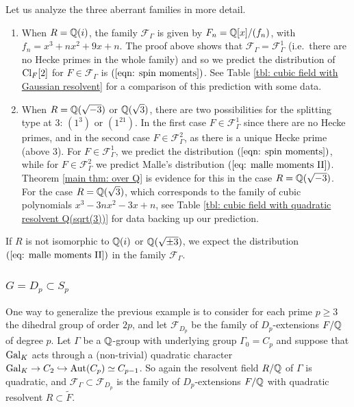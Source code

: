 \documentclass[11pt,a4paper]{amsart}
\def\Q{{\rm \mathbb{Q}}}
\def\Aut{{\rm Aut}}
\def\Cl{{\rm Cl}}
\def\Gal{{\rm Gal}}
\numberwithin{equation}{section}
\begin{document}
Let us analyze the three aberrant families in more detail. 
\begin{enumerate}
    \item 
When $R = \Q(i)$, the family $\mathcal{F}_\Gamma$ is given by $F_n = \Q[x]/(f_n)$, with $f_n = x^3 + nx^2 + 9x + n$. The proof above shows that $\mathcal{F}_\Gamma =\mathcal{F}_\Gamma^1$ (i.e.\ there are no Hecke primes in the whole family) and so we predict the distribution of $\Cl_F[2]$ for $F\in \mathcal{F}_\Gamma$ is $(\ref{eqn: spin moments})$.  See Table \ref{tbl: cubic field with Gaussian resolvent} for a comparison of this prediction with some data.
\item When $R = \Q(\sqrt{-3})$ or $\Q(\sqrt{3})$, there are two possibilities for the splitting type at $3$: $(1^3)$ or $(1^21)$. In the first case $F \in \mathcal{F}_\Gamma^1$ since there are no Hecke primes, and in the second case $F \in \mathcal{F}_\Gamma^2$, as there is a unique Hecke prime (above $3$). For $F \in \mathcal{F}_\Gamma^1$, we predict the distribution $(\ref{eqn: spin moments})$, while for $F \in \mathcal{F}_\Gamma^2$ we predict Malle's distribution $(\ref{eq: malle moments II})$. Theorem \ref{main thm: over Q} is evidence for this in the case $R = \Q(\sqrt{-3})$. For the case $R = \Q(\sqrt{3})$, which corresponds to the family of cubic polynomials $x^3 - 3nx^2 - 3x + n$, see Table \ref{tbl: cubic field with quadratic resolvent Q(sqrt(3))} for data backing up our prediction.


\end{enumerate}

If $R$ is not isomorphic to $\Q(i)$ or $\Q(\sqrt{\pm3})$, we expect the distribution $(\ref{eq: malle moments II})$ in the family $\mathcal{F}_\Gamma$.

\subsubsection{$G = D_p \subset S_p$}

One way to generalize the previous example is to consider for each prime $p \geq 3$ the dihedral group of order $2p$, and let $\mathcal{F}_{D_p}$ be the family of $D_p$-extensions $F/\Q$ of degree $p$.  Let $\Gamma$ be a $\Q$-group with underlying group $\Gamma_0 = C_p$ and suppose that $\Gal_K$ acts through a (non-trivial) quadratic character $\Gal_K \to C_2 \hookrightarrow \Aut(C_p) \simeq C_{p-1}$.  So again the resolvent field $R/\Q$ of $\Gamma$ is quadratic, and $\mathcal{F}_\Gamma \subset \mathcal{F}_{D_p}$ is the family of $D_p$-extensions $F/\Q$ with quadratic resolvent $R \subset \tilde F$. 
\end{document}
